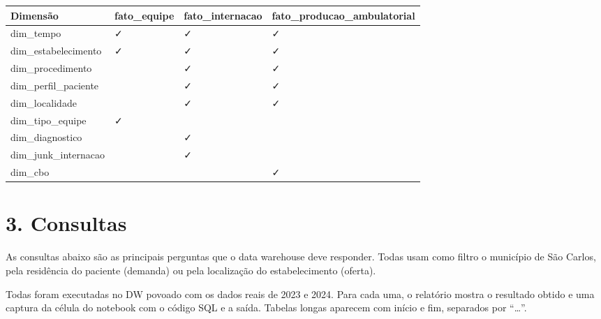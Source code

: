 \documentclass[12pt,a4paper]{article}
\begin{document}
\par\noindent\begin{minipage}{\linewidth}\small{}\begin{tabular}{|>{\raggedright\arraybackslash}p{}|>{\raggedright\arraybackslash}p{}|>{\raggedright\arraybackslash}p{}|>{\raggedright\arraybackslash}p{}|}\hline\rowcolor{azul}\color{white}\bfseries Dimensão & \color{white}\bfseries fato\_\allowbreak{}equipe & \color{white}\bfseries fato\_\allowbreak{}internacao & \color{white}\bfseries fato\_\allowbreak{}producao\_\allowbreak{}ambulatorial \\ \hline
dim\_\allowbreak{}tempo & ✓ & ✓ & ✓ \\ \hline
dim\_\allowbreak{}estabelecimento & ✓ & ✓ & ✓ \\ \hline
dim\_\allowbreak{}procedimento &  & ✓ & ✓ \\ \hline
dim\_\allowbreak{}perfil\_\allowbreak{}paciente &  & ✓ & ✓ \\ \hline
dim\_\allowbreak{}localidade &  & ✓ & ✓ \\ \hline
dim\_\allowbreak{}tipo\_\allowbreak{}equipe & ✓ &  &  \\ \hline
dim\_\allowbreak{}diagnostico &  & ✓ &  \\ \hline
dim\_\allowbreak{}junk\_\allowbreak{}internacao &  & ✓ &  \\ \hline
dim\_\allowbreak{}cbo &  &  & ✓ \\ \hline\end{tabular}\end{minipage}\par\medskip

\clearpage

\FloatBarrier\section*{3. Consultas}

As consultas abaixo são as principais perguntas que o data warehouse deve responder. Todas usam como filtro o município de São Carlos, pela residência do paciente (demanda) ou pela localização do estabelecimento (oferta).


Todas foram executadas no DW povoado com os dados reais de 2023 e 2024. Para cada uma, o relatório mostra o resultado obtido e uma captura da célula do notebook com o código SQL e a saída. Tabelas longas aparecem com início e fim, separados por “…”.
\end{document}
